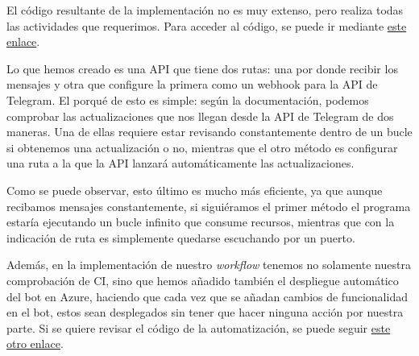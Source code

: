 El código resultante de la implementación no es muy extenso, pero realiza todas las 
actividades que requerimos. Para acceder al código, se puede ir mediante 
\href{https://github.com/jero-dev/proyecto-tfg/blob/main/src/bot/telegram/main.go}{este enlace}.

Lo que hemos creado es una API que tiene dos rutas: una por donde recibir los 
mensajes y otra que configure la primera como un webhook para la API de Telegram. 
El porqué de esto es simple: según la documentación, podemos comprobar las 
actualizaciones que nos llegan desde la API de Telegram de dos maneras. Una de 
ellas requiere estar revisando constantemente dentro de un bucle si obtenemos 
una actualización o no, mientras que el otro método es configurar una ruta a la que 
la API lanzará automáticamente las actualizaciones.

Como se puede observar, esto último es mucho más eficiente, ya que aunque recibamos 
mensajes constantemente,  si siguiéramos el primer método el programa estaría 
ejecutando un bucle infinito que consume recursos, mientras que con la indicación 
de ruta es simplemente quedarse escuchando por un puerto.

Además, en la implementación de nuestro \textit{workflow} 
tenemos no solamente nuestra comprobación de CI, sino que hemos añadido también el 
despliegue automático del bot en Azure, haciendo que cada vez que se añadan cambios 
de funcionalidad en el bot, estos sean desplegados sin tener que hacer ninguna 
acción por nuestra parte. Si se quiere revisar el código de la automatización, se 
puede seguir 
\href{https://github.com/jero-dev/proyecto-tfg/blob/main/.github/workflows/bot-telegram-ci.yml}{este otro enlace}.
